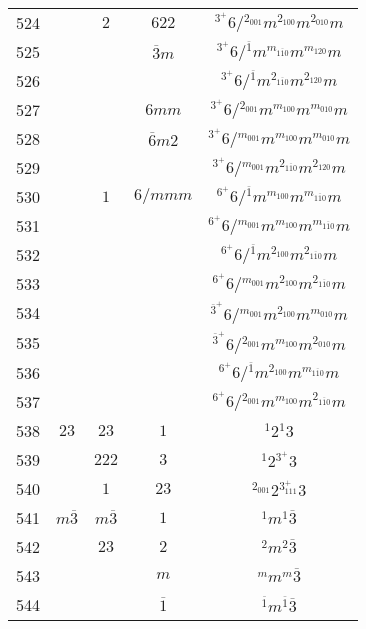 \begin{longtable}{ccccc}
  524 &  & $2$ & $622$ & ${}^{3^{+}} 6  / {}^{2_{001}} m {}^{2_{100}} m {}^{2_{010}} m $\\
  525 &  &  & $\overline{3}m$ & ${}^{3^{+}} 6  / {}^{\overline{1}} m {}^{m_{1\overline{1}0}} m {}^{m_{120}} m $\\
  526 &  &  &  & ${}^{3^{+}} 6  / {}^{\overline{1}} m {}^{2_{1\overline{1}0}} m {}^{2_{120}} m $\\
  527 &  &  & $6mm$ & ${}^{3^{+}} 6  / {}^{2_{001}} m {}^{m_{100}} m {}^{m_{010}} m $\\
  528 &  &  & $\overline{6}m2$ & ${}^{3^{+}} 6  / {}^{m_{001}} m {}^{m_{100}} m {}^{m_{010}} m $\\
  529 &  &  &  & ${}^{3^{+}} 6  / {}^{m_{001}} m {}^{2_{1\overline{1}0}} m {}^{2_{120}} m $\\
  530 &  & $1$ & $6/mmm$ & ${}^{6^{+}} 6  / {}^{\overline{1}} m {}^{m_{100}} m {}^{m_{1\overline{1}0}} m $\\
  531 &  &  &  & ${}^{6^{+}} 6  / {}^{m_{001}} m {}^{m_{100}} m {}^{m_{1\overline{1}0}} m $\\
  532 &  &  &  & ${}^{6^{+}} 6  / {}^{\overline{1}} m {}^{2_{100}} m {}^{2_{1\overline{1}0}} m $\\
  533 &  &  &  & ${}^{6^{+}} 6  / {}^{m_{001}} m {}^{2_{100}} m {}^{2_{1\overline{1}0}} m $\\
  534 &  &  &  & ${}^{\overline{3}^{+}} 6  / {}^{m_{001}} m {}^{2_{100}} m {}^{m_{010}} m $\\
  535 &  &  &  & ${}^{\overline{3}^{+}} 6  / {}^{2_{001}} m {}^{m_{100}} m {}^{2_{010}} m $\\
  536 &  &  &  & ${}^{6^{+}} 6  / {}^{\overline{1}} m {}^{2_{100}} m {}^{m_{1\overline{1}0}} m $\\
  537 &  &  &  & ${}^{6^{+}} 6  / {}^{2_{001}} m {}^{m_{100}} m {}^{2_{1\overline{1}0}} m $\\
  538 & $23$ & $23$ & $1$ & ${}^{1} 2 {}^{1} 3 $\\
  539 &  & $222$ & $3$ & ${}^{1} 2 {}^{3^{+}} 3 $\\
  540 &  & $1$ & $23$ & ${}^{2_{001}} 2 {}^{3^{+}_{111}} 3 $\\
  541 & $m\overline{3}$ & $m\overline{3}$ & $1$ & ${}^{1} m {}^{1} \overline{3} $\\
  542 &  & $23$ & $2$ & ${}^{2} m {}^{2} \overline{3} $\\
  543 &  &  & $m$ & ${}^{m} m {}^{m} \overline{3} $\\
  544 &  &  & $\overline{1}$ & ${}^{\overline{1}} m {}^{\overline{1}} \overline{3} $\\

\end{longtable}
